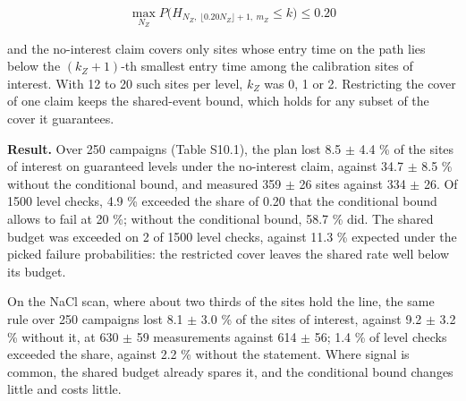 \documentclass{iopjournal}
\begin{document}
\[
\max_{N_Z} P\big(H_{N_Z,\ \lfloor 0.20 N_Z \rfloor + 1,\ m_Z} \le k\big) \le 0.20
\]

and the no-interest claim covers only sites whose entry time on the path lies below the \((k_Z + 1)\)-th smallest entry time among the calibration sites of interest. With 12 to 20 such sites per level, \(k_Z\) was 0, 1 or 2. Restricting the cover of one claim keeps the shared-event bound, which holds for any subset of the cover it guarantees.

\textbf{Result.} Over 250 campaigns (Table S10.1), the plan lost 8.5 \ensuremath{\pm} 4.4 \% of the sites of interest on guaranteed levels under the no-interest claim, against 34.7 \ensuremath{\pm} 8.5 \% without the conditional bound, and measured 359 \ensuremath{\pm} 26 sites against 334 \ensuremath{\pm} 26. Of 1500 level checks, 4.9 \% exceeded the share of 0.20 that the conditional bound allows to fail at 20 \%; without the conditional bound, 58.7 \% did. The shared budget was exceeded on 2 of 1500 level checks, against 11.3 \% expected under the picked failure probabilities: the restricted cover leaves the shared rate well below its budget.

On the NaCl scan, where about two thirds of the sites hold the line, the same rule over 250 campaigns lost 8.1 \ensuremath{\pm} 3.0 \% of the sites of interest, against 9.2 \ensuremath{\pm} 3.2 \% without it, at 630 \ensuremath{\pm} 59 measurements against 614 \ensuremath{\pm} 56; 1.4 \% of level checks exceeded the share, against 2.2 \% without the statement. Where signal is common, the shared budget already spares it, and the conditional bound changes little and costs little.
\end{document}
